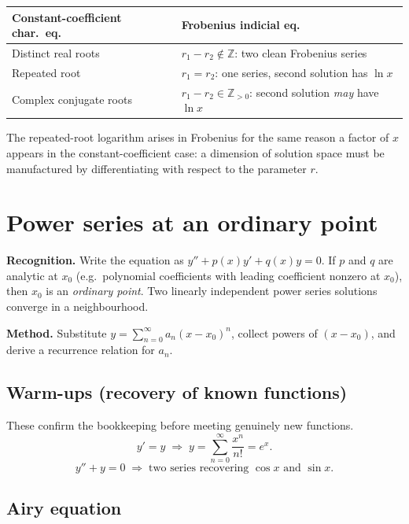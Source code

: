 \documentclass{essay}
\begin{document}
\begin{center}
  \renewcommand{\arraystretch}{1.4}
  \begin{tabular}{ll}
    \toprule
    \textbf{Constant-coefficient char.\ eq.} & \textbf{Frobenius indicial eq.} \\
    \midrule
    Distinct real roots & \(r_{1} - r_{2} \notin \mathbb{Z}\): two clean Frobenius series \\
    Repeated root & \(r_{1} = r_{2}\): one series, second solution has \(\ln x\) \\
    Complex conjugate roots & \(r_{1} - r_{2} \in \mathbb{Z}_{>0}\): second solution \emph{may} have \(\ln x\) \\
    \bottomrule
  \end{tabular}
\end{center}

The repeated-root logarithm arises in Frobenius for the same reason a factor of \(x\) appears in the constant-coefficient case: a dimension of solution space must be manufactured by differentiating with respect to the parameter \(r\).

\section{Power series at an ordinary point}

\textbf{Recognition.}  Write the equation as \(y'' + p(x)y' + q(x)y = 0\).  If \(p\) and \(q\) are analytic at \(x_{0}\) (e.g.\ polynomial coefficients with leading coefficient nonzero at \(x_{0}\)), then \(x_{0}\) is an \emph{ordinary point}.  Two linearly independent power series solutions converge in a neighbourhood.

\textbf{Method.}  Substitute \(y = \sum_{n=0}^{\infty} a_{n} (x - x_{0})^{n}\), collect powers of \((x-x_{0})\), and derive a recurrence relation for \(a_{n}\).

\subsection*{Warm-ups (recovery of known functions)}

These confirm the bookkeeping before meeting genuinely new functions.
\[ y' = y \;\Rightarrow\; y = \sum_{n=0}^{\infty} \frac{x^{n}}{n!} = e^{x}. \]
\[ y'' + y = 0 \;\Rightarrow\; \text{two series recovering } \cos x \text{ and } \sin x. \]

\subsection*{Airy equation}
\end{document}
